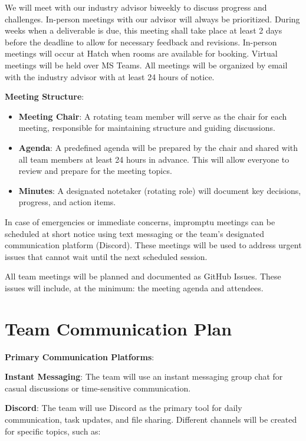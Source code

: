 \documentclass{article}
\begin{document}
We will meet with our industry advisor biweekly to discuss progress and challenges. In-person meetings with our advisor will always be prioritized. During weeks when a deliverable is due, this meeting shall take place at least 2 days before the deadline to allow for necessary feedback and revisions. In-person meetings will occur at Hatch when rooms are available for booking. Virtual meetings will be held over MS Teams. All meetings will be organized by email with the industry advisor with at least 24 hours of notice.

\textbf{Meeting Structure}:
\begin{itemize}
  \item \textbf{Meeting Chair}: A rotating team member will serve as the chair for each meeting, responsible for maintaining structure and guiding discussions.
  \item \textbf{Agenda}: A predefined agenda will be prepared by the chair and shared with all team members at least 24 hours in advance. This will allow everyone to review and prepare for the meeting topics.
  \item \textbf{Minutes}: A designated notetaker (rotating role) will document key decisions, progress, and action items.
\end{itemize}

In case of emergencies or immediate concerns, impromptu meetings can be scheduled at short notice using text messaging or the team’s designated communication platform (Discord). These meetings will be used to address urgent issues that cannot wait until the next scheduled session. 

All team meetings will be planned and documented as GitHub Issues. These issues will include, at the minimum: the meeting agenda and attendees.

\section{Team Communication Plan}
\textbf{Primary Communication Platforms}:
\begin{flushleft}
  \textbf{Instant Messaging}: The team will use an instant messaging group chat for casual discussions or time-sensitive communication.
\end{flushleft}

\textbf{Discord}: The team will use Discord as the primary tool for daily communication, task updates, and file sharing. Different channels will be created for specific topics, such as:
\end{document}
